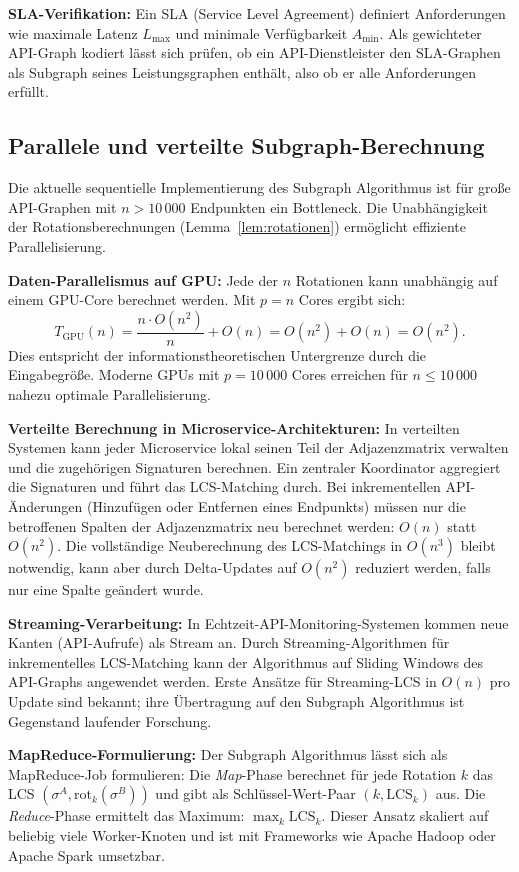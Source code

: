 ﻿\documentclass[a4paper,12pt]{article}
\theoremstyle{definition}
\begin{document}
\textbf{SLA-Verifikation:} Ein SLA (Service Level Agreement) definiert Anforderungen
wie maximale Latenz $L_{\max}$ und minimale Verfügbarkeit $A_{\min}$. Als gewichteter
API-Graph kodiert lässt sich prüfen, ob ein API-Dienstleister den SLA-Graphen als
Subgraph seines Leistungsgraphen enthält, also ob er alle Anforderungen erfüllt.

\subsection{Parallele und verteilte Subgraph-Berechnung}

Die aktuelle sequentielle Implementierung des Subgraph Algorithmus ist für große
API-Graphen mit $n > 10\,000$ Endpunkten ein Bottleneck. Die Unabhängigkeit der
Rotationsberechnungen (Lemma~\ref{lem:rotationen}) ermöglicht effiziente Parallelisierung.

\textbf{Daten-Parallelismus auf GPU:} Jede der $n$ Rotationen kann unabhängig auf
einem GPU-Core berechnet werden. Mit $p = n$ Cores ergibt sich:
\[
  T_{\mathrm{GPU}}(n) = \frac{n \cdot O(n^2)}{n} + O(n) = O(n^2) + O(n) = O(n^2).
\]
Dies entspricht der informationstheoretischen Untergrenze durch die Eingabegröße.
Moderne GPUs mit $p = 10\,000$ Cores erreichen für $n \leq 10\,000$ nahezu optimale
Parallelisierung.

\textbf{Verteilte Berechnung in Microservice-Architekturen:} In verteilten Systemen
kann jeder Microservice lokal seinen Teil der Adjazenzmatrix verwalten und die
zugehörigen Signaturen berechnen. Ein zentraler Koordinator aggregiert die Signaturen
und führt das LCS-Matching durch. Bei inkrementellen API-Änderungen (Hinzufügen
oder Entfernen eines Endpunkts) müssen nur die betroffenen Spalten der Adjazenzmatrix
neu berechnet werden: $O(n)$ statt $O(n^2)$. Die vollständige Neuberechnung des
LCS-Matchings in $O(n^3)$ bleibt notwendig, kann aber durch Delta-Updates auf
$O(n^2)$ reduziert werden, falls nur eine Spalte geändert wurde.

\textbf{Streaming-Verarbeitung:} In Echtzeit-API-Monitoring-Systemen kommen
neue Kanten (API-Aufrufe) als Stream an. Durch Streaming-Algorithmen für
inkrementelles LCS-Matching kann der Algorithmus auf Sliding Windows des
API-Graphs angewendet werden. Erste Ansätze für Streaming-LCS in $O(n)$ pro
Update sind bekannt; ihre Übertragung auf den Subgraph Algorithmus ist Gegenstand
laufender Forschung.

\textbf{MapReduce-Formulierung:} Der Subgraph Algorithmus lässt sich als
MapReduce-Job formulieren: Die \emph{Map}-Phase berechnet für jede Rotation
$k$ das LCS $(\sigma^A, \mathrm{rot}_k(\sigma^B))$ und gibt als Schlüssel-Wert-Paar
$(k, \mathrm{LCS}_k)$ aus. Die \emph{Reduce}-Phase ermittelt das Maximum:
$\max_k \mathrm{LCS}_k$. Dieser Ansatz skaliert auf beliebig viele Worker-Knoten
und ist mit Frameworks wie Apache Hadoop oder Apache Spark umsetzbar.
\end{document}
